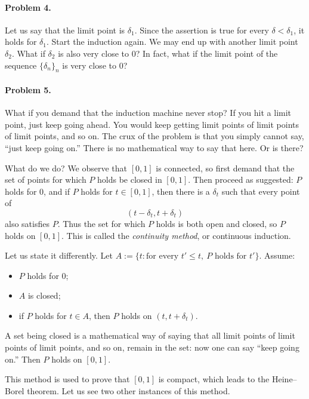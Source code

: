\documentclass[11pt,a4paper]{article}
\begin{document}
\paragraph{Problem 4.}
Let us say that the limit point is $\delta_1$. Since the assertion is true for every $\delta<\delta_1$, it holds for $\delta_1$. Start the induction again. We may end up with another limit point $\delta_2$. What if $\delta_2$ is also very close to $0$? In fact, what if the limit point of the sequence $\{\delta_n\}_n$ is very close to $0$?

\paragraph{Problem 5.}
What if you demand that the induction machine never stop? If you hit a limit point, just keep going ahead. You would keep getting limit points of limit points of limit points, and so on. The crux of the problem is that you simply cannot say, ``just keep going on.'' There is no mathematical way to say that here. Or is there?


What do we do? We observe that $[0,1]$ is connected, so first demand that the set of points for which $P$ holds be closed in $[0,1]$. Then proceed as suggested: $P$ holds for $0$, and if $P$ holds for $t\in[0,1]$, then there is a $\delta_t$ such that every point of
\[
(t-\delta_t,t+\delta_t)
\]
also satisfies $P$. Thus the set for which $P$ holds is both open and closed, so $P$ holds on $[0,1]$. This is called the \emph{continuity method}, or continuous induction.

Let us state it differently. Let \(A:=\{t: \text{for every }t'\leq t,\ P\text{ holds for }t'\}.\)
Assume:
\begin{itemize}
\item $P$ holds for $0$;
\item $A$ is closed;
\item if $P$ holds for $t\in A$, then $P$ holds on $(t,t+\delta_t)$.
\end{itemize}
A set being closed is a mathematical way of saying that all limit points of limit points of limit points, and so on, remain in the set: now one can say ``keep going on.'' Then $P$ holds on $[0,1]$.

This method is used to prove that $[0,1]$ is compact, which leads to the Heine--Borel theorem. Let us see two other instances of this method.
\end{document}
